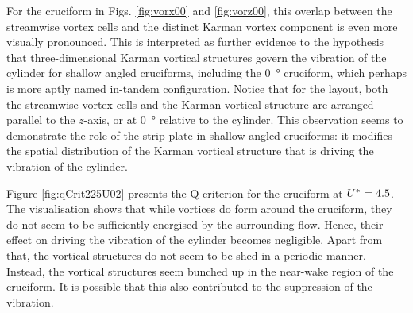 \documentclass[oneside]{utmthesis}
\begin{document}
For the \angon{} cruciform in Figs. \ref{fig:vorx00} and \ref{fig:vorz00}, this overlap between the streamwise vortex cells and the distinct Karman vortex component is even more visually pronounced. This is interpreted as further evidence to the hypothesis that three-dimensional Karman vortical structures govern the vibration of the cylinder for shallow angled cruciforms, including the \SI{0}{\degree} cruciform, which perhaps is more aptly named in-tandem configuration. Notice that for the \angon{} layout, both the streamwise vortex cells and the Karman vortical structure are arranged parallel to the $z$-axis, or at \SI{0}{\degree} relative to the cylinder. This observation seems to demonstrate the role of the strip plate in shallow angled cruciforms: it modifies the spatial distribution of the Karman vortical structure that is driving the vibration of the cylinder.

Figure \ref{fig:qCrit225U02} presents the Q-criterion for the \angtw{} cruciform at $U^{*} = 4.5$. The visualisation shows that while vortices do form around the cruciform, they do not seem to be sufficiently energised by the surrounding flow. Hence, their effect on driving the vibration of the cylinder becomes negligible. Apart from that, the vortical structures do not seem to be shed in a periodic manner. Instead, the vortical structures seem bunched up in the near-wake region of the cruciform. It is possible that this also contributed to the suppression of the vibration.
\end{document}

